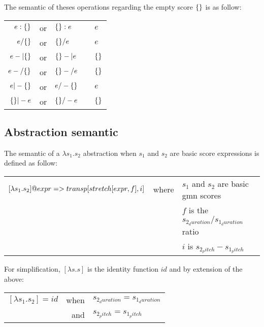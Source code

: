 \documentclass[10pt,a4paper,frenchb]{article}
\begin{document}
The semantic of theses operations regarding the empty score $\{\}$ is as follow:
\begin{center}
\begin{tabular}{rclc@{$\rightarrow$\ }l}
 $e : \{\}$ & or & $\{\} : e$ &  & $e$  \\
 $e / \{\}$ & or & $\{\} / e$ &  & $e$  \\
 $e -| \{\}$ & or & $\{\} -| e$ &  & $\{\}$  \\
 $e -/ \{\}$ & or & $\{\} -/ e$ &  & $\{\}$  \\
 $e |- \{\}$ & or & $e /- \{\}$ &  & $e$  \\
 $\{\} |- e$ & or & $\{\} /- e$ &  & $\{\}$  \\
\end{tabular}
\end{center}


\subsection{Abstraction semantic}

The semantic of a $\lambda s_1.s_2$ abstraction when $s_1$ and $s_2$ are basic score expressions is defined as follow:

\begin{center}
\begin{tabular}{rcl}
 $[\lambda s_1.s_2] @ expr => transp[stretch[expr, f], i]$ & where & $s_1$ and $s_2$ are basic gmn scores \\
 	& & $f$ is the $s_{2_duration} / s_{1_duration}$ ratio \\
 	& & $i$ is $s_{2_pitch} - s_{1_pitch}$ \\
\end{tabular}
\end{center}

For simplification, $[\lambda s.s]$ is the identity function $id$ and by extension of the above:
\vspace{-6mm}\\ 
\begin{center}
\begin{tabular}{rrl}
 $[\lambda s_1.s_2] = id$ & when & $s_{2_duration} = s_{1_duration}$ \\
 	& and & $s_{2_pitch} = s_{1_pitch}$ \\
\end{tabular}
\end{center}
\end{document}
